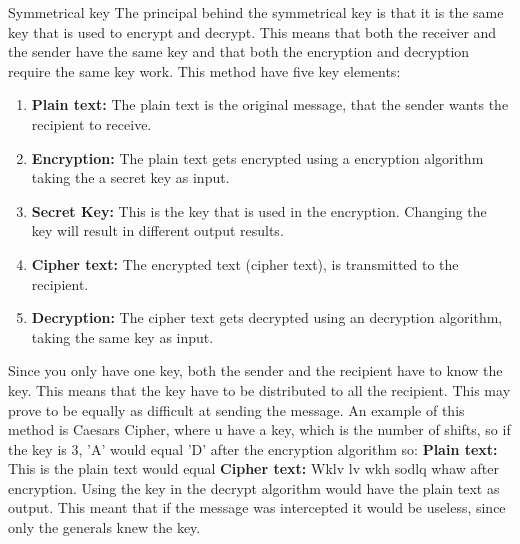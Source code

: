 Symmetrical key
The principal behind the symmetrical key is that it is the same key that is used to encrypt and decrypt. This means that both the receiver and the sender have the same key and that both the encryption and decryption require the same key work. This method have five key elements:
\begin{enumerate}
\item \textbf{Plain text:} The plain text is the original message, that the sender wants the recipient to receive.
\item \textbf{Encryption:} The plain text gets encrypted using a encryption algorithm taking the a secret key as input.
\item \textbf{Secret Key:} This is the key that is used in the encryption. Changing the key will result in different output results.
\item \textbf{Cipher text:} The encrypted text (cipher text), is transmitted to the recipient.
\item \textbf{Decryption:} The cipher text gets decrypted using an decryption algorithm, taking the same key as input.\cite{lecture9}
\end{enumerate}
Since you only have one key, both the sender and the recipient have to know the key. This means that the key have to be distributed to all the recipient. This may prove to be equally as difficult at sending the message. \cite{birmingham} An example of this method is Caesars Cipher, where u have a key, which is the number of shifts, so if the key is 3, 'A' would equal 'D' after the encryption algorithm so:
\textbf{Plain text:} This is the plain text
would equal 
\textbf{Cipher text:} Wklv lv wkh sodlq whaw
after encryption. Using the key in the decrypt algorithm would have the plain text as output. This meant that if the message was intercepted it would be useless, since only the generals knew the key.\cite{caesar}